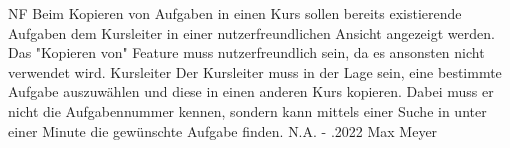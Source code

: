 \begin{myreq}
    \threeinline
    {\reqno }
    {\reqtype NF}
    {}
    \reqdesc Beim Kopieren von Aufgaben in einen Kurs sollen bereits existierende Aufgaben dem Kursleiter in einer nutzerfreundlichen Ansicht angezeigt werden.
    \reqrat Das "Kopieren von" Feature muss nutzerfreundlich sein, da es ansonsten nicht verwendet wird.
    \reqorig Kursleiter
    \reqfit Der Kursleiter muss in der Lage sein, eine bestimmte Aufgabe auszuwählen und diese in einen anderen Kurs kopieren. Dabei muss er nicht die Aufgabennummer kennen, sondern kann mittels einer Suche in unter einer Minute die gewünschte Aufgabe finden.
    \twoinline
    {}
    {}
    \twoinline
    {}
    {\reqconf N.A.}
    \reqmater -
    .2022 Max Meyer
\end{myreq}